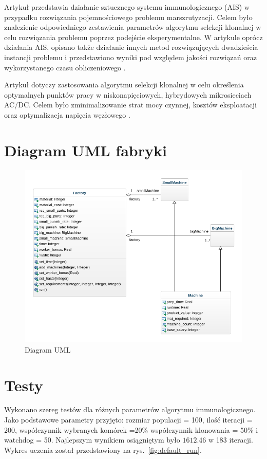 \documentclass[a4paper]{article}
\begin{document}
Artykuł przedstawia działanie sztucznego systemu immunologicznego (AIS) w przypadku rozwiązania pojemnościowego problemu marszrutyzacji. Celem było znalezienie odpowiedniego zestawienia parametrów algorytmu selekcji klonalnej w celu rozwiązania problemu poprzez podejście eksperymentalne. W artykule oprócz działania AIS, opisano także działanie innych metod rozwiązujących dwadzieścia instancji problemu i przedstawiono wyniki pod względem jakości rozwiązań oraz wykorzystanego czasu obliczeniowego \cite{thapatsuwan}.


Artykuł dotyczy zastosowania algorytmu selekcji klonalnej w celu określenia optymalnych punktów pracy w niskonapięciowych, hybrydowych mikrosieciach AC/DC. Celem było zminimalizowanie strat mocy czynnej, kosztów eksploatacji oraz optymalizacja napięcia węzłowego \cite{rokicki}.


\section{Diagram UML fabryki}
\begin{figure}[ht]
\centering
\includegraphics[width=.7\textwidth]{UML_Model.png}
\caption{Diagram UML}
\end{figure}

\section{Testy}

Wykonano szereg testów dla różnych parametrów algorytmu immunologicznego. 
Jako podstawowe parametry przyjęto: rozmiar populacji = 100, ilość iteracji = 200, współczynnik wybranych komórek =20\% współczynnik klonowania = 50\% i watchdog = 50.
Najlepszym wynikiem osiągniętym było $1612.46$ w 183 iteracji. Wykres uczenia został przedstawiony na rys.~\ref{fig:default_run}.
\end{document}
